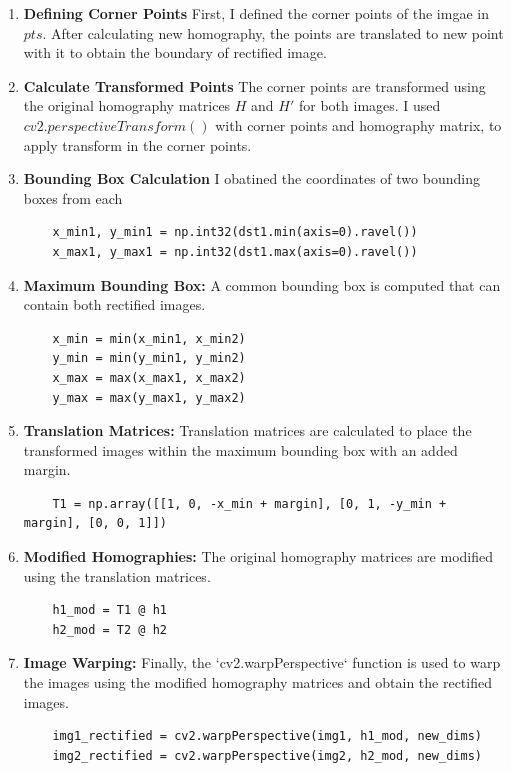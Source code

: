 \begin{enumerate}
    \item \textbf{Defining Corner Points} First, I defined the corner points of the imgae in $pts$. After calculating new homography, the points are translated to new point with it to obtain the boundary of rectified image.
    
    \item \textbf{Calculate Transformed Points} The corner points are transformed using the original homography matrices $H$ and $H'$ for both images. I used $cv2.perspectiveTransform()$ with corner points and homography matrix, to apply transform in the corner points.

    \item \textbf{Bounding Box Calculation} I obatined the coordinates of two bounding boxes from each 
    \begin{verbatim}
    x_min1, y_min1 = np.int32(dst1.min(axis=0).ravel())
    x_max1, y_max1 = np.int32(dst1.max(axis=0).ravel())
    \end{verbatim}

    \item \textbf{Maximum Bounding Box:} A common bounding box is computed that can contain both rectified images.
    \begin{verbatim}
    x_min = min(x_min1, x_min2)
    y_min = min(y_min1, y_min2)
    x_max = max(x_max1, x_max2)
    y_max = max(y_max1, y_max2)
    \end{verbatim}
    
    \item \textbf{Translation Matrices:} Translation matrices are calculated to place the transformed images within the maximum bounding box with an added margin.
    \begin{verbatim}
    T1 = np.array([[1, 0, -x_min + margin], [0, 1, -y_min + margin], [0, 0, 1]])
    \end{verbatim}
    
    \item \textbf{Modified Homographies:} The original homography matrices are modified using the translation matrices.
    \begin{verbatim}
    h1_mod = T1 @ h1
    h2_mod = T2 @ h2
    \end{verbatim}

    \item \textbf{Image Warping:} Finally, the `cv2.warpPerspective` function is used to warp the images using the modified homography matrices and obtain the rectified images.
    \begin{verbatim}
    img1_rectified = cv2.warpPerspective(img1, h1_mod, new_dims)
    img2_rectified = cv2.warpPerspective(img2, h2_mod, new_dims)
    \end{verbatim}
\end{enumerate}

